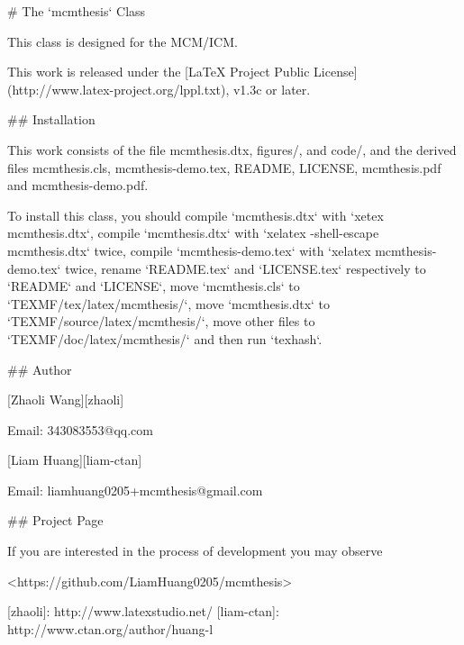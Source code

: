  
# The `mcmthesis` Class

This class is designed for the MCM/ICM.

This work is released under the [LaTeX Project Public
License](http://www.latex-project.org/lppl.txt), v1.3c or later.

## Installation

This work consists of the file mcmthesis.dtx,
                               figures/, and
                               code/,
and the derived files          mcmthesis.cls,
                               mcmthesis-demo.tex,
                               README,
                               LICENSE,
                               mcmthesis.pdf and
                               mcmthesis-demo.pdf.

To install this class, you should
    compile `mcmthesis.dtx` with `xetex mcmthesis.dtx`,
    compile `mcmthesis.dtx` with `xelatex -shell-escape mcmthesis.dtx` twice,
    compile `mcmthesis-demo.tex` with `xelatex mcmthesis-demo.tex` twice,
    rename `README.tex` and `LICENSE.tex` respectively to
      `README` and `LICENSE`,
    move `mcmthesis.cls` to `TEXMF/tex/latex/mcmthesis/`,
    move `mcmthesis.dtx` to `TEXMF/source/latex/mcmthesis/`,
    move other files     to `TEXMF/doc/latex/mcmthesis/` and then
    run `texhash`.

## Author

[Zhaoli Wang][zhaoli]

Email: 343083553@qq.com

[Liam Huang][liam-ctan]

Email: liamhuang0205+mcmthesis@gmail.com

## Project Page

If you are interested in the process of development you may observe

<https://github.com/LiamHuang0205/mcmthesis>

[zhaoli]: http://www.latexstudio.net/
[liam-ctan]: http://www.ctan.org/author/huang-l
